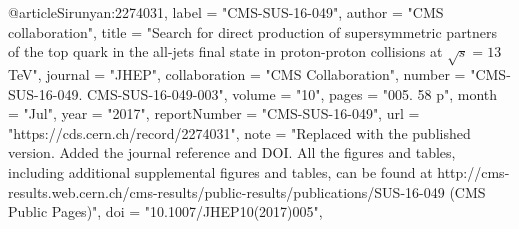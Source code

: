 @article{Sirunyan:2274031,
      label          = "CMS-SUS-16-049",
      author        = "{CMS collaboration}",
      title         = "{Search for direct production of supersymmetric partners
                       of the top quark in the all-jets final state in
                       proton-proton collisions at $ \sqrt{s}=13 $ TeV}",
      journal       = "JHEP",
      collaboration = "CMS Collaboration",
      number        = "CMS-SUS-16-049. CMS-SUS-16-049-003",
      volume        = "10",
      pages         = "005. 58 p",
      month         = "Jul",
      year          = "2017",
      reportNumber  = "CMS-SUS-16-049",
      url           = "https://cds.cern.ch/record/2274031",
      note          = "Replaced with the published version. Added the journal
                       reference and DOI. All the figures and tables, including
                       additional supplemental figures and tables, can be found at
                       http://cms-results.web.cern.ch/cms-results/public-results/publications/SUS-16-049
                       (CMS Public Pages)",
      doi           = "10.1007/JHEP10(2017)005",
}

